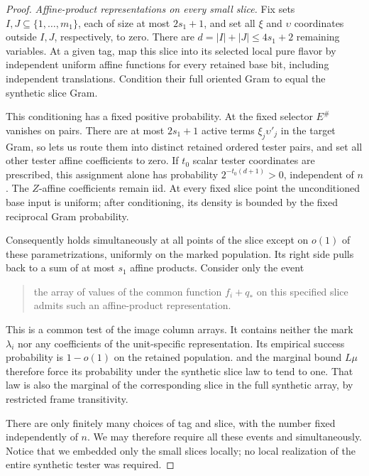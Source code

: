 \begin{proof}
\medskip\noindent
\emph{Affine-product representations on every small slice.}
Fix sets \(I,J\subseteq\{1,\ldots,m_1\}\), each of size at
most \(2s_1+1\), and set all \(\xi\) and \(\upsilon\)
coordinates outside \(I,J\), respectively, to zero.
There are \(d=|I|+|J|\le4s_1+2\) remaining variables.
At a given tag, map this slice into its selected local pure
flavor by independent uniform affine functions for every
retained base bit, including independent translations.
Condition their full oriented Gram to equal the synthetic
slice Gram.

This conditioning has a fixed positive probability.
At the fixed selector \(E^\#\) vanishes on pairs.
There are at most \(2s_1+1\) active terms
\(\xi_j\upsilon'_j\) in the target Gram, so
 lets us route them into
distinct retained ordered tester pairs, and set all other
tester affine coefficients to zero.  If \(t_0\) scalar
tester coordinates are prescribed, this assignment alone
has probability \(2^{-t_0(d+1)}>0\), independent of \(n\).
The \(Z\)-affine coefficients remain iid.
At every fixed slice point the unconditioned base input is
uniform; after conditioning, its density is bounded by the
fixed reciprocal Gram probability.

Consequently  holds simultaneously
at all points of the slice except on \(o(1)\) of these
parametrizations, uniformly on the marked population.
Its right side pulls back to a sum of at most \(s_1\)
affine products.  Consider only the event
\begin{quote}
the array of values of the common function \(f_i+q_*\) on
this specified slice admits such an affine-product
representation.
\end{quote}
This is a common test of the image column arrays.  It contains
neither the mark \(\lambda_i\) nor any coefficients of the
unit-specific representation.  Its empirical success
probability is \(1-o(1)\) on the retained population.
 and the marginal bound \(L\mu\)
therefore force its probability under the synthetic slice
law to tend to one.  That law is also the marginal of the
corresponding slice in the full synthetic array, by restricted
frame transitivity.

There are only finitely many choices of tag and slice, with
the number fixed independently of \(n\).  We may therefore
require all these events and 
simultaneously.  Notice that we embedded only the small
slices locally; no local realization of the entire synthetic
tester was required.


\end{proof}
